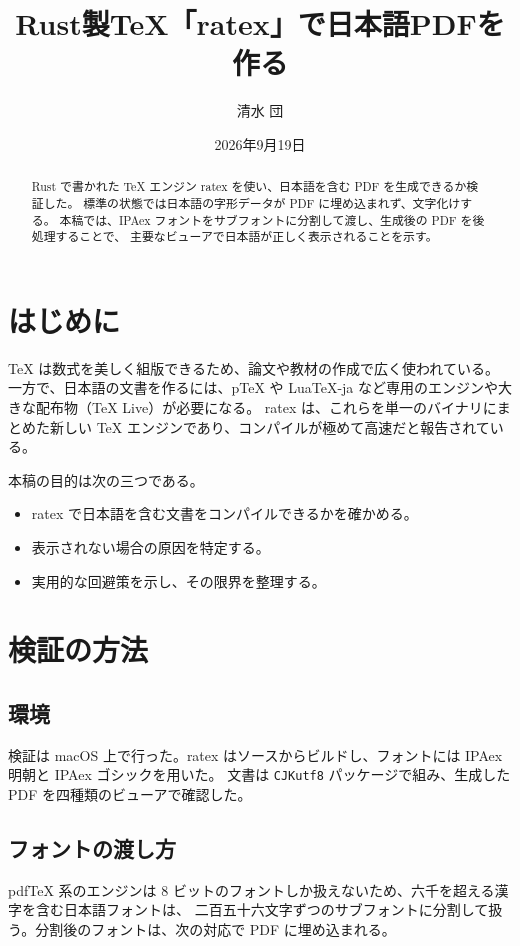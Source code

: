 \documentclass[11pt]{article}
\newcommand{\goth}[1]{{\sffamily #1}}
\renewcommand{\today}{2026年9月19日}
\begin{document}
\title{\goth{Rust製TeX「ratex」で日本語PDFを作る}}
\author{\goth{清水 団}}
\date{\today}
\maketitle

\begin{abstract}
Rust で書かれた TeX エンジン ratex を使い、日本語を含む PDF を生成できるか検証した。
標準の状態では日本語の字形データが PDF に埋め込まれず、文字化けする。
本稿では、IPAex フォントをサブフォントに分割して渡し、生成後の PDF を後処理することで、
主要なビューアで日本語が正しく表示されることを示す。
\end{abstract}

\tableofcontents

\section{\goth{はじめに}}
TeX は数式を美しく組版できるため、論文や教材の作成で広く使われている。
一方で、日本語の文書を作るには、pTeX や LuaTeX-ja など専用のエンジンや大きな配布物（TeX Live）が必要になる。
ratex は、これらを単一のバイナリにまとめた新しい TeX エンジンであり、コンパイルが極めて高速だと報告されている。

本稿の目的は次の三つである。
\begin{itemize}
  \item ratex で日本語を含む文書をコンパイルできるかを確かめる。
  \item 表示されない場合の原因を特定する。
  \item 実用的な回避策を示し、その限界を整理する。
\end{itemize}

\section{\goth{検証の方法}}
\subsection{\goth{環境}}
検証は macOS 上で行った。ratex はソースからビルドし、フォントには IPAex 明朝と IPAex ゴシックを用いた。
文書は \texttt{CJKutf8} パッケージで組み、生成した PDF を四種類のビューアで確認した。

\subsection{\goth{フォントの渡し方}}
pdfTeX 系のエンジンは 8 ビットのフォントしか扱えないため、六千を超える漢字を含む日本語フォントは、
二百五十六文字ずつのサブフォントに分割して扱う。分割後のフォントは、次の対応で PDF に埋め込まれる。
\end{document}
